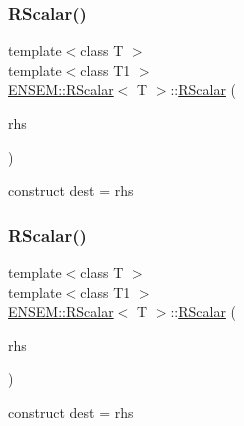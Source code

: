 \subsubsection{\texorpdfstring{RScalar()}{RScalar()}\hspace{0.1cm}{\footnotesize\ttfamily [3/15]}}
{\footnotesize\ttfamily template$<$class T $>$ \\
template$<$class T1 $>$ \\
\mbox{\hyperlink{classENSEM_1_1RScalar}{E\+N\+S\+E\+M\+::\+R\+Scalar}}$<$ T $>$\+::\mbox{\hyperlink{classENSEM_1_1RScalar}{R\+Scalar}} (\begin{DoxyParamCaption}\item[{const \mbox{\hyperlink{classENSEM_1_1RScalar}{R\+Scalar}}$<$ T1 $>$ \&}]{rhs }\end{DoxyParamCaption})\hspace{0.3cm}{\ttfamily [inline]}}



construct dest = rhs 

\mbox{\label{classENSEM_1_1RScalar_aef7513413ed5dbf6bb8bc37b73b88d00}} 
\subsubsection{\texorpdfstring{RScalar()}{RScalar()}\hspace{0.1cm}{\footnotesize\ttfamily [4/15]}}
{\footnotesize\ttfamily template$<$class T $>$ \\
template$<$class T1 $>$ \\
\mbox{\hyperlink{classENSEM_1_1RScalar}{E\+N\+S\+E\+M\+::\+R\+Scalar}}$<$ T $>$\+::\mbox{\hyperlink{classENSEM_1_1RScalar}{R\+Scalar}} (\begin{DoxyParamCaption}\item[{const T1 \&}]{rhs }\end{DoxyParamCaption})\hspace{0.3cm}{\ttfamily [inline]}}



construct dest = rhs 

\mbox{\label{classENSEM_1_1RScalar_a6aff5b3d3e105c89b56329e817eca759}} 
